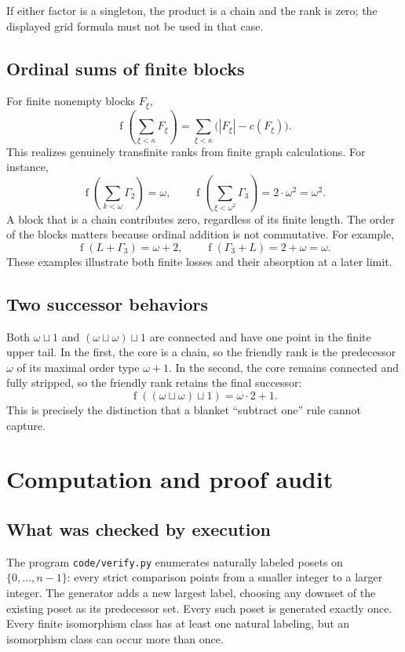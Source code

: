 \documentclass[11pt,a4paper]{article}
\theoremstyle{definition}
\theoremstyle{remark}
\DeclareMathOperator{\fot}{f}
\newcommand{\ds}{\mathbin{\sqcup}}
\begin{document}
If either factor is a singleton, the product is a chain and the rank is
zero; the displayed grid formula must not be used in that case.

\subsection{Ordinal sums of finite blocks}

For finite nonempty blocks $F_\xi$,
\[
\fot\left(\sum_{\xi<\kappa}F_\xi\right)
=\sum_{\xi<\kappa}\bigl(|F_\xi|-c(F_\xi)\bigr).
\]
This realizes genuinely transfinite ranks from finite graph calculations.
For instance,
\[
\fot\left(\sum_{k<\omega}\Gamma_2\right)=\omega,
\qquad
\fot\left(\sum_{\xi<\omega^2}\Gamma_3\right)
=2\cdot\omega^2=\omega^2.
\]
A block that is a chain contributes zero, regardless of its finite length.
The order of the blocks matters because ordinal addition is not
commutative. For example,
\[
\fot(L+\Gamma_3)=\omega+2,
\qquad
\fot(\Gamma_3+L)=2+\omega=\omega.
\]
These examples illustrate both finite losses and their absorption at a
later limit.

\subsection{Two successor behaviors}

Both $\omega\ds1$ and $(\omega\ds\omega)\ds1$ are connected and have one
point in the finite upper tail. In the first, the core is a chain, so the
friendly rank is the predecessor $\omega$ of its maximal order type
$\omega+1$. In the second, the core remains connected and fully stripped,
so the friendly rank retains the final successor:
\[
\fot((\omega\ds\omega)\ds1)=\omega\cdot2+1.
\]
This is precisely the distinction that a blanket ``subtract one'' rule
cannot capture.

\section{Computation and proof audit}\label{sec:audit}

\subsection{What was checked by execution}

The program \texttt{code/verify.py} enumerates naturally labeled posets on
$\{0,\ldots,n-1\}$: every strict comparison points from a smaller integer to
a larger integer. The generator adds a new largest label, choosing any
downset of the existing poset as its predecessor set. Every such poset is
generated exactly once. Every finite isomorphism class has at least one
natural labeling, but an isomorphism class can occur more than once.
\end{document}
